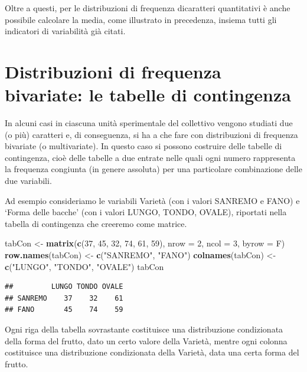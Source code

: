 \documentclass[a4paper,12pt,oneside]{book}
\newenvironment{Shaded}{\begin{snugshade}}{\end{snugshade}}
\newcommand{\KeywordTok}[1]{\textcolor[rgb]{0.13,0.29,0.53}{\textbf{#1}}}
\newcommand{\DataTypeTok}[1]{\textcolor[rgb]{0.13,0.29,0.53}{#1}}
\newcommand{\DecValTok}[1]{\textcolor[rgb]{0.00,0.00,0.81}{#1}}
\newcommand{\StringTok}[1]{\textcolor[rgb]{0.31,0.60,0.02}{#1}}
\newcommand{\NormalTok}[1]{#1}
\begin{document}
Oltre a questi, per le distribuzioni di frequenza dicaratteri
quantitativi è anche possibile calcolare la media, come illustrato in
precedenza, insiema tutti gli indicatori di variabilità già citati.

\section{Distribuzioni di frequenza bivariate: le tabelle di
contingenza}\label{distribuzioni-di-frequenza-bivariate-le-tabelle-di-contingenza}

In alcuni casi in ciascuna unità sperimentale del collettivo vengono
studiati due (o più) caratteri e, di conseguenza, si ha a che fare con
distribuzioni di frequenza bivariate (o multivariate). In questo caso si
possono costruire delle tabelle di contingenza, cioè delle tabelle a due
entrate nelle quali ogni numero rappresenta la frequenza congiunta (in
genere assoluta) per una particolare combinazione delle due variabili.

Ad esempio consideriamo le variabili Varietà (con i valori SANREMO e
FANO) e `Forma delle bacche' (con i valori LUNGO, TONDO, OVALE),
riportati nella tabella di contingenza che creeremo come matrice.

\begin{Shaded}
\begin{Highlighting}[]
\NormalTok{tabCon <-}\StringTok{ }\KeywordTok{matrix}\NormalTok{(}\KeywordTok{c}\NormalTok{(}\DecValTok{37}\NormalTok{, }\DecValTok{45}\NormalTok{, }\DecValTok{32}\NormalTok{, }\DecValTok{74}\NormalTok{, }\DecValTok{61}\NormalTok{, }\DecValTok{59}\NormalTok{), }\DataTypeTok{nrow =} \DecValTok{2}\NormalTok{, }\DataTypeTok{ncol =} \DecValTok{3}\NormalTok{,}
                 \DataTypeTok{byrow =}\NormalTok{ F)}
\KeywordTok{row.names}\NormalTok{(tabCon) <-}\StringTok{ }\KeywordTok{c}\NormalTok{(}\StringTok{"SANREMO"}\NormalTok{, }\StringTok{"FANO"}\NormalTok{)}
\KeywordTok{colnames}\NormalTok{(tabCon) <-}\StringTok{ }\KeywordTok{c}\NormalTok{(}\StringTok{"LUNGO"}\NormalTok{, }\StringTok{"TONDO"}\NormalTok{, }\StringTok{"OVALE"}\NormalTok{)}
\NormalTok{tabCon}
\end{Highlighting}
\end{Shaded}

\begin{verbatim}
##         LUNGO TONDO OVALE
## SANREMO    37    32    61
## FANO       45    74    59
\end{verbatim}

Ogni riga della tabella sovrastante costituisce una distribuzione
condizionata della forma del frutto, dato un certo valore della Varietà,
mentre ogni colonna costituisce una distribuzione condizionata della
Varietà, data una certa forma del frutto.
\end{document}
